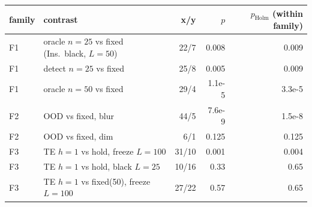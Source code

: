 \begin{tabular}{llrrr}
\toprule
family & contrast & x/y & $p$ & $p_{\mathrm{Holm}}$ (within family) \\
\midrule
F1 & oracle $n{=}25$ vs fixed (Ins.\ black, $L{=}50$) & 22/7 & 0.008 & 0.009 \\
F1 & detect $n{=}25$ vs fixed & 25/8 & 0.005 & 0.009 \\
F1 & oracle $n{=}50$ vs fixed & 29/4 & 1.1e-5 & 3.3e-5 \\
F2 & OOD vs fixed, blur & 44/5 & 7.6e-9 & 1.5e-8 \\
F2 & OOD vs fixed, dim & 6/1 & 0.125 & 0.125 \\
F3 & TE $h{=}1$ vs hold, freeze $L{=}100$ & 31/10 & 0.001 & 0.004 \\
F3 & TE $h{=}1$ vs hold, black $L{=}25$ & 10/16 & 0.33 & 0.65 \\
F3 & TE $h{=}1$ vs fixed(50), freeze $L{=}100$ & 27/22 & 0.57 & 0.65 \\
\bottomrule
\end{tabular}
